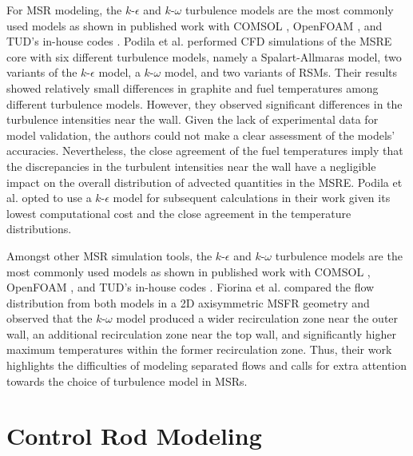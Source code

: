 For MSR modeling, the $k$-$\epsilon$ and $k$-$\omega$ turbulence models are the
most commonly used models as shown in published work with COMSOL
\cite{fiorina_modelling_2014}, OpenFOAM \cite{aufiero_development_2014}, and
\gls{TUD}'s in-house codes \cite{fiorina_modelling_2014,tiberga_results_2020}.
Podila et al. \cite{podila_cfd_2019} performed \gls{CFD} simulations of the
\gls{MSRE} core with six different turbulence models, namely a Spalart-Allmaras
model, two variants of the $k$-$\epsilon$ model, a $k$-$\omega$ model, and two
variants of \glspl{RSM}. Their results showed relatively small differences
in graphite and fuel temperatures among different turbulence models. However,
they observed significant differences in the turbulence intensities near the
wall. Given the lack of experimental data for model validation, the authors
could not make a clear assessment of the models' accuracies. Nevertheless, the
close agreement of the fuel temperatures imply that the discrepancies in the
turbulent intensities near the wall have a negligible impact on the overall
distribution of advected quantities in the \gls{MSRE}. Podila et al.
\cite{podila_cfd_2019} opted to use a $k$-$\epsilon$ model for subsequent
calculations in their work given its lowest computational cost and the close
agreement in the temperature distributions.

Amongst other \gls{MSR} simulation tools, the $k$-$\epsilon$ and $k$-$\omega$
turbulence models are the most commonly used models as shown in published work
with COMSOL \cite{fiorina_modelling_2014}, OpenFOAM
\cite{aufiero_development_2014}, and \gls{TUD}'s in-house codes
\cite{fiorina_modelling_2014,tiberga_results_2020}. Fiorina et al.
\cite{fiorina_modelling_2014} compared the flow distribution from both models
in a 2D axisymmetric \gls{MSFR} geometry and observed that the $k$-$\omega$
model produced a wider recirculation zone near the outer wall, an additional
recirculation zone near the top wall, and significantly higher maximum
temperatures within the former recirculation zone. Thus, their work highlights
the difficulties of modeling separated flows and calls for extra attention
towards the choice of turbulence model in \glspl{MSR}.

\section{Control Rod Modeling}

